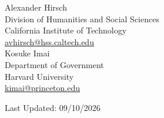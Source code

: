 \documentclass[margin, 10pt]{res} %
\begin{document}
\begin{resume}
\noindent Alexander Hirsch\\
\noindent Division of Humanities and Social Sciences\\
\noindent California Institute of Technology\\
\noindent \href{mailto:avhirsch@hss.caltech.edu}{avhirsch@hss.caltech.edu}\\

\noindent Kosuke Imai\\
\noindent Department of Government\\
\noindent Harvard University\\
\noindent \href{mailto:kimai@princeton.edu}{kimai@princeton.edu}\\
\end{resume}


Last Updated: 09/10/2026
\end{document}
